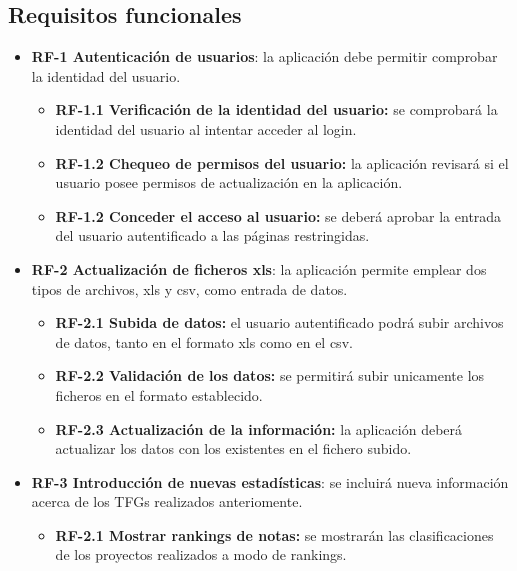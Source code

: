 \subsection{Requisitos funcionales}
\begin{itemize}
	
	\item \textbf{RF-1 Autenticación de usuarios}: la aplicación debe permitir comprobar la identidad del usuario.
	\begin{itemize}
		\item \textbf{RF-1.1 Verificación de la identidad del usuario:} se comprobará la identidad del usuario al intentar acceder al login.
		\item \textbf{RF-1.2 Chequeo de permisos del usuario:} la aplicación revisará si el usuario posee permisos de actualización en la aplicación.
		\item \textbf{RF-1.2 Conceder el acceso al usuario:} se deberá aprobar la entrada del usuario autentificado a las páginas restringidas.
	\end{itemize}

	\item \textbf{RF-2 Actualización de ficheros xls}: la aplicación permite emplear dos tipos de archivos, xls y csv, como entrada de datos.
	\begin{itemize}
		\item \textbf{RF-2.1 Subida de datos:} el usuario autentificado podrá subir archivos de datos, tanto en el formato xls como en el csv. 
		\item \textbf{RF-2.2 Validación de los datos:} se permitirá subir unicamente los ficheros en el formato establecido.
		\item \textbf{RF-2.3 Actualización de la información:} la aplicación deberá actualizar los datos con los existentes en el fichero subido.
	\end{itemize}

	\item \textbf{RF-3 Introducción de nuevas estadísticas}: se incluirá nueva información acerca de los TFGs realizados anteriomente.
	\begin{itemize}
		\item \textbf{RF-2.1 Mostrar rankings de notas:} se mostrarán las clasificaciones de los proyectos realizados a modo de rankings.
	\end{itemize}
		
\end{itemize}

